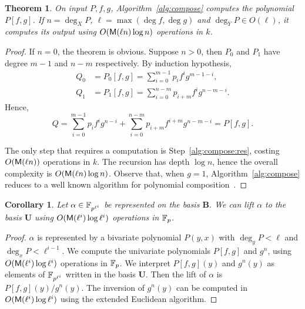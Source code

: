 \documentclass{sig-alternate}
\newtheorem{theorem}[definition]{Theorem}
\newtheorem{corollary}[definition]{Corollary}
\newcommand{\bb}{\mathbf{B}}
\newcommand{\uu}{\mathbf{U}}  %
\begin{document}
\begin{theorem}
  \label{th:compose}
  On input $P,f,g$, Algorithm~\ref{alg:compose} computes the
  polynomial $P[f,g]$. If $n=\deg_XP$, $\ell=\max(\deg f, \deg g)$ and
  $\deg_YP\in O(\ell)$, it computes its output using $O(\mathsf{M}(\ell
  n)\log n)$ operations in $k$.
\end{theorem}
\begin{proof}
  If $n=0$, the theorem is obvious. Suppose $n>0$, then $P_0$ and
  $P_1$ have degree $m-1$ and $n-m$ respectively. By induction
  hypothesis,
  \begin{equation}
    \begin{aligned}
      Q_0 &= P_0[f,g] = \sum_{i=0}^{m-1}p_if^ig^{m-1-i},\\
      Q_1 &= P_1[f,g] = \sum_{i=0}^{n-m}p_{i+m}f^ig^{n-m-i}.   
    \end{aligned}
  \end{equation}
  Hence,
  \begin{equation}
    Q = \sum_{i=0}^{m-1}p_if^ig^{n-i} +
    \sum_{i=0}^{n-m}p_{i+m}f^{i+m}g^{n-m-i} =
    P[f,g].
  \end{equation}

  The only step that requires a computation is
  Step~\ref{alg:compose:res}, costing $O(\mathsf{M}(\ell n))$ operations in
  $k$. The recursion has depth $\log n$, hence the overall complexity
  is $O(\mathsf{M}(\ell n)\log n)$.  Observe that, when $g=1$,
  Algorithm~\ref{alg:compose} reduces to a well known algorithm for
  polynomial composition~\cite[Ex.~9.20]{vzGG}.
\end{proof}

\begin{corollary}
  Let $\alpha\in\mathbb{F}_{p^{\ell^i}}$ be represented on the basis $\bb$.
  We can \emph{lift} $\alpha$ to the basis $\uu$ using
  $O(\mathsf{M}(\ell^i)\log\ell^i)$ operations in $\mathbb{F}_p$.
\end{corollary}
\begin{proof}
  $\alpha$ is represented by a bivariate polynomial $P(y,x)$ with
  $\deg_yP<\ell$ and $\deg_xP<\ell^{i-1}$.  We compute the univariate
  polynomials $P[f,g]$ and $g^n$, using $O(\mathsf{M}(\ell^i)\log\ell^i)$
  operations in $\mathbb{F}_p$. We interpret $P[f,g](y)$ and $g^n(y)$ as
  elements of $\mathbb{F}_{p^{\ell^i}}$ written in the basis $\uu$. Then the
  lift of $\alpha$ is $P[f,g](y)/g^n(y)$. The inversion of $g^n(y)$
  can be computed in $O(\mathsf{M}(\ell^i)\log\ell^i)$ using the extended
  Euclidean algorithm.
\end{proof}
\end{document}
